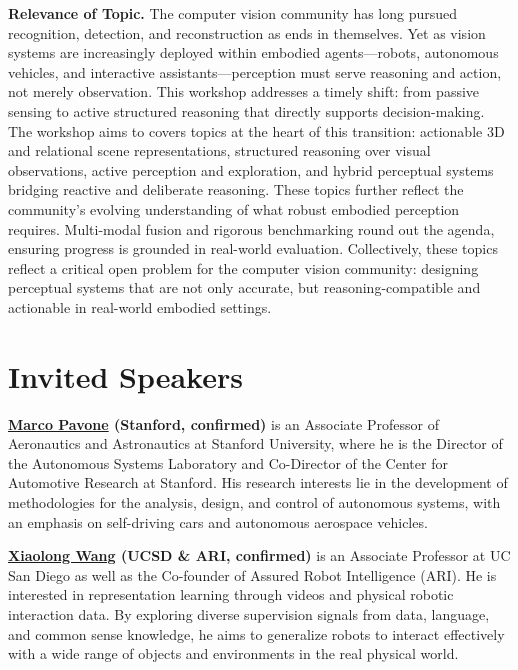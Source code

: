 \documentclass[runningheads]{llncs}
\newcommand{\todo}[1]{{\color{red}#1}}
\begin{document}
\vspace{-1em}

\noindent
\textbf{Relevance of Topic.}
The computer vision community has long pursued recognition, detection, and reconstruction 
as ends in themselves. Yet as vision systems are increasingly deployed within embodied 
agents—robots, autonomous vehicles, and interactive assistants—perception must serve 
reasoning and action, not merely observation. This workshop addresses a timely shift: 
from passive sensing to active structured reasoning that directly supports decision-making.
The workshop aims to covers topics at the heart of this transition: 
actionable 3D and relational 
scene representations, structured reasoning 
over visual observations, active perception and exploration, and hybrid perceptual systems 
bridging reactive and deliberate reasoning. These topics further reflect the community's evolving 
understanding of what robust embodied perception requires. Multi-modal fusion and 
rigorous benchmarking round out the agenda, ensuring progress is grounded in 
real-world evaluation.
Collectively, these topics reflect a critical open problem for the computer vision 
community: designing perceptual systems that are not only accurate, but reasoning-compatible 
and actionable in real-world embodied settings.

\vspace{-1.25em}

\section{Invited Speakers}

\vspace{-1.25em}
\textbf{%
\href{https://web.stanford.edu/~pavone/}
{\textcolor{emailblue}{Marco Pavone}} (Stanford, confirmed)
}%
is an Associate Professor of Aeronautics and Astronautics at Stanford University, where he is the Director of the Autonomous Systems Laboratory and Co-Director of the Center for Automotive Research at Stanford. His research interests lie in the development of methodologies for the analysis, design, and control of autonomous systems, with an emphasis on self-driving cars and autonomous aerospace vehicles.

\vspace{-0.5em}
\textbf{%
\href{https://xiaolonw.github.io/}
{\textcolor{emailblue}{Xiaolong Wang}} (UCSD \& ARI, confirmed)
}%
is an Associate Professor at UC San Diego as well as the Co-founder of Assured Robot Intelligence (ARI). He is interested in representation learning through videos and physical robotic interaction data. By exploring diverse supervision signals from data, language, and common sense knowledge, he aims to generalize robots to interact effectively with a wide range of objects and environments in the real physical world.
\end{document}
